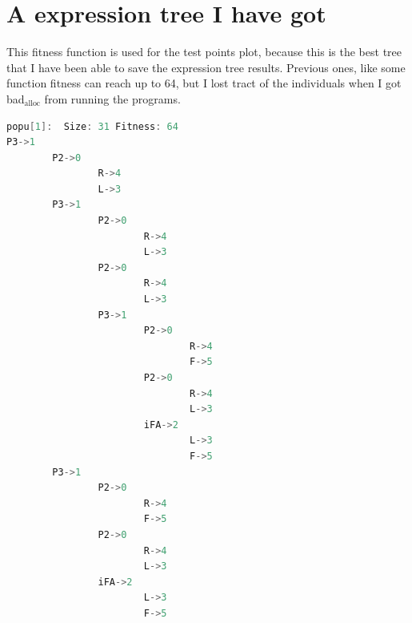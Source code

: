 \documentclass[10pt,b5paper]{article}
\begin{document}
\section{A expression tree I have got}
\label{sec-5}
This fitness function is used for the test points plot, because this is the best tree that I have been able to save the expression tree results. Previous ones, like some function fitness can reach up to 64, but I lost tract of the individuals when I got bad$_{\text{alloc}}$ from running the programs. 
\begin{lstlisting}[language=c++]
popu[1]:  Size: 31 Fitness: 64
P3->1
        P2->0
                R->4
                L->3
        P3->1
                P2->0
                        R->4
                        L->3
                P2->0
                        R->4
                        L->3
                P3->1
                        P2->0
                                R->4
                                F->5
                        P2->0
                                R->4
                                L->3
                        iFA->2
                                L->3
                                F->5
        P3->1
                P2->0
                        R->4
                        F->5
                P2->0
                        R->4
                        L->3
                iFA->2
                        L->3
                        F->5
\end{lstlisting}
\end{document}
